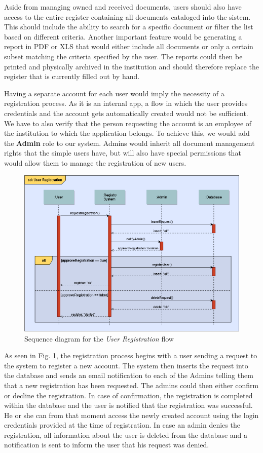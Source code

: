 Aside from managing owned and received documents, users should also have access to the entire register containing all documents cataloged into the sistem. This should include the ability to search for a specific document or filter the list based on different criteria. Another important feature would be generating a report in PDF or XLS that would either include all documents or only a certain subset matching the criteria specified by the user. The reports could then be printed and physically archived in the institution and should therefore replace the register that is currently filled out by hand.

Having a separate account for each user would imply the necessity of a registration process. As it is an internal app, a flow in which the user provides credentials and the account gets automatically created would not be sufficient. We have to also verify that the person requesting the account is an employee of the institution to which the application belongs. To achieve this, we would add the \textbf{Admin} role to our system. Admins would inherit all document management rights that the simple users have, but will also have special permissions that would allow them to manage the registration of new users.

\begin{figure}[H]
    \centering
    \includegraphics[width=5in]{images/sequenceDiagram}
    \caption{Sequence diagram for the \textit{User Registration} flow}
    \label{sequenceDiagram}
\end{figure}

As seen in Fig. \ref{sequenceDiagram}, the registration process begins with a user sending a request to the system to register a new account. The system then inserts the request into the database and sends an email notification to each of the Admins telling them that a new registration has been requested. The admins could then either confirm or decline the registration. In case of confirmation, the registration is completed within the database and the user is notified that the registration was successful. He or she can from that moment access the newly created account using the login credentials provided at the time of registration. In case an admin denies the registration, all information about the user is deleted from the database and a notification is sent to inform the user that his request was denied.



